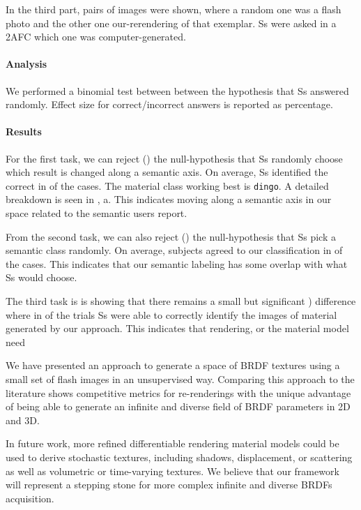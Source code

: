 \documentclass[acmtog, review, anonymous]{acmart}
\begin{document}
In the third part,  pairs of images were shown, where a random one was a flash photo and the other one our-rerendering of that exemplar.
Ss were asked in a \ac{2AFC} which one was computer-generated.

\paragraph{Analysis}
We performed a binomial test between between the hypothesis that Ss answered randomly.
Effect size for correct/incorrect answers is reported as percentage.

\paragraph{Results}
For the first task, we can reject () the null-hypothesis that Ss randomly choose which result is changed along a semantic axis.
On average, Ss identified the correct in  of the cases.
The material class working best is \unsure\texttt{dingo}.
A detailed breakdown is seen in , a.
This indicates moving along a semantic axis in our space related to the semantic users report.

From the second task, we can also reject () the null-hypothesis that Ss pick a semantic class randomly.
On average, subjects agreed to our classification in  of the cases.
This indicates that our semantic labeling has some overlap with what Ss would choose.

The third task is is showing that there remains a small but significant ) difference where in   of the trials Ss were able to correctly identify the images of material generated by our approach.
This indicates that rendering, or the material model need

We have presented an approach to generate a space of BRDF textures using a small set of flash images in an unsupervised way.
Comparing this approach to the literature shows competitive metrics for re-renderings with the unique advantage of being able to generate an infinite and diverse field of BRDF parameters in 2D and 3D.

In future work, more refined differentiable rendering  material models could be used to derive stochastic textures, including shadows, displacement, or scattering as well as volumetric or time-varying textures.
We believe that our framework will represent a stepping stone for more complex infinite and diverse BRDFs acquisition.



\end{document}
